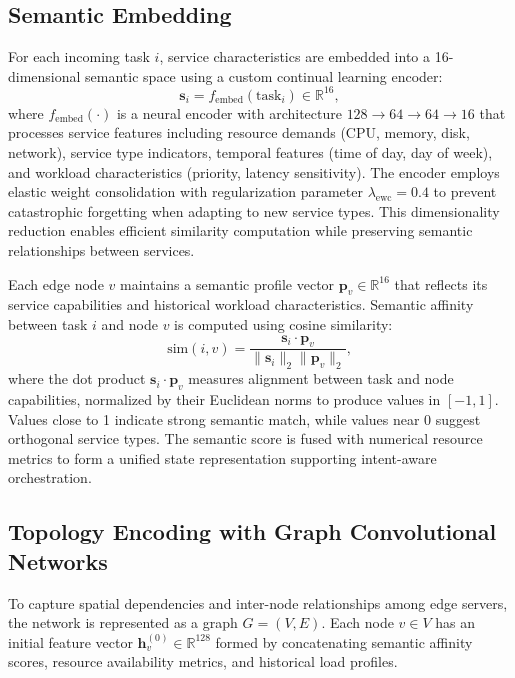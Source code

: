 \documentclass[conference]{IEEEtran}
\begin{document}
	\subsection{Semantic Embedding}
	For each incoming task $i$, service characteristics are embedded into a 16-dimensional semantic space using a custom continual learning encoder:
	\begin{equation}
		\mathbf{s}_i = f_{\text{embed}}(\text{task}_i) \in \mathbb{R}^{16},
	\end{equation}
	where $f_{\text{embed}}(\cdot)$ is a neural encoder with architecture $128 \rightarrow 64 \rightarrow 64 \rightarrow 16$ that processes service features including resource demands (CPU, memory, disk, network), service type indicators, temporal features (time of day, day of week), and workload characteristics (priority, latency sensitivity). The encoder employs elastic weight consolidation with regularization parameter $\lambda_{\text{ewc}} = 0.4$ to prevent catastrophic forgetting when adapting to new service types. This dimensionality reduction enables efficient similarity computation while preserving semantic relationships between services.
	
	Each edge node $v$ maintains a semantic profile vector $\mathbf{p}_v \in \mathbb{R}^{16}$ that reflects its service capabilities and historical workload characteristics. Semantic affinity between task $i$ and node $v$ is computed using cosine similarity:
	\begin{equation}
		\text{sim}(i,v) = \frac{\mathbf{s}_i \cdot \mathbf{p}_v}{\|\mathbf{s}_i\|_2 \|\mathbf{p}_v\|_2},
	\end{equation}
	where the dot product $\mathbf{s}_i \cdot \mathbf{p}_v$ measures alignment between task and node capabilities, normalized by their Euclidean norms to produce values in $[-1, 1]$. Values close to 1 indicate strong semantic match, while values near 0 suggest orthogonal service types. The semantic score is fused with numerical resource metrics to form a unified state representation supporting intent-aware orchestration.
	
	\subsection{Topology Encoding with Graph Convolutional Networks}
	To capture spatial dependencies and inter-node relationships among edge servers, the network is represented as a graph $G = (V, E)$. Each node $v \in V$ has an initial feature vector $\mathbf{h}_v^{(0)} \in \mathbb{R}^{128}$ formed by concatenating semantic affinity scores, resource availability metrics, and historical load profiles.
	
\end{document}
